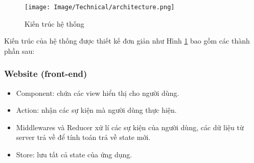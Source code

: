 \begin{figure}[H]
    \begin{center}
        \texttt{[image: Image/Technical/architecture.png]}
        \caption{Kiến trúc hệ thống}
        \label{architecture}
    \end{center}
\end{figure}

Kiến trúc của hệ thống được thiết kế đơn giản như Hình \ref{architecture} bao gồm các thành phần sau:
\subsubsection{Website (front-end)}
\begin{itemize}
    \item Component: chứa các view hiển thị cho người dùng.
    \item Action: nhận các sự kiện mà người dùng thực hiện.
    \item Middlewares và Reducer xử lí các sự kiện của người dùng, các dữ liệu từ server trả về để tính toán trả về state mới.
    \item Store: lưu tất cả state của ứng dụng.
\end{itemize}
